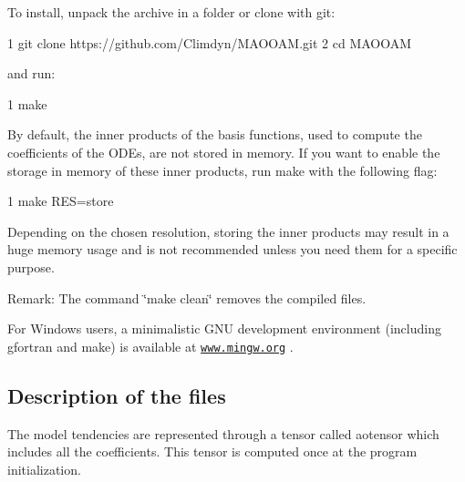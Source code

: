 To install, unpack the archive in a folder or clone with git\+:


\begin{DoxyCode}
1 git clone https://github.com/Climdyn/MAOOAM.git
2 cd MAOOAM
\end{DoxyCode}


and run\+:


\begin{DoxyCode}
1 make
\end{DoxyCode}
 By default, the inner products of the basis functions, used to compute the coefficients of the O\+D\+Es, are not stored in memory. If you want to enable the storage in memory of these inner products, run make with the following flag\+:


\begin{DoxyCode}
1 make RES=store
\end{DoxyCode}


Depending on the chosen resolution, storing the inner products may result in a huge memory usage and is not recommended unless you need them for a specific purpose.

Remark\+: The command \char`\"{}make clean\char`\"{} removes the compiled files.

For Windows users, a minimalistic G\+NU development environment (including gfortran and make) is available at \href{http://www.mingw.org}{\tt www.\+mingw.\+org} . 



\subsection*{Description of the files}

The model tendencies are represented through a tensor called aotensor which includes all the coefficients. This tensor is computed once at the program initialization.



